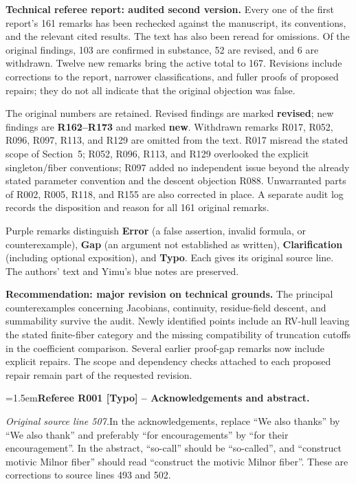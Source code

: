 \documentclass[12pt]{amsart}
\newcommand{\RefereeRemark}[4]{%
  \par\medskip\begingroup\normalfont\small\color{RefereePurple}%
  \emergencystretch=1.5em\noindent\textbf{Referee R#1 [#2] -- #3.}\par\nobreak\noindent #4\par
  \endgroup\medskip
}
\theoremstyle{plain}
\theoremstyle{definition}
\theoremstyle{remark}
\numberwithin{equation}{section}
\theoremstyle{plain}
\newcommand{\0}{\emptyset}
\begin{document}
{\normalfont\small\color{RefereePurple}
\noindent\textbf{Technical referee report: audited second version.}
Every one of the first report's 161 remarks has been rechecked against the manuscript, its conventions, and the relevant cited results. The text has also been reread for omissions. Of the original findings, 103 are confirmed in substance, 52 are revised, and 6 are withdrawn. Twelve new remarks bring the active total to 167. Revisions include corrections to the report, narrower classifications, and fuller proofs of proposed repairs; they do not all indicate that the original objection was false.
\par\smallskip
The original numbers are retained. Revised findings are marked \textbf{revised}; new findings are \textbf{R162--R173} and marked \textbf{new}. Withdrawn remarks R017, R052, R096, R097, R113, and R129 are omitted from the text. R017 misread the stated scope of Section~5; R052, R096, R113, and R129 overlooked the explicit singleton/fiber conventions; R097 added no independent issue beyond the already stated parameter convention and the descent objection R088. Unwarranted parts of R002, R005, R118, and R155 are also corrected in place. A separate audit log records the disposition and reason for all 161 original remarks.
\par\smallskip
Purple remarks distinguish \textbf{Error} (a false assertion, invalid formula, or counterexample), \textbf{Gap} (an argument not established as written), \textbf{Clarification} (including optional exposition), and \textbf{Typo}. Each gives its original source line. The authors' text and Yimu's blue notes are preserved.
\par\smallskip
\noindent\textbf{Recommendation: major revision on technical grounds.}
The principal counterexamples concerning Jacobians, continuity, residue-field descent, and summability survive the audit. Newly identified points include an RV-hull leaving the stated finite-fiber category and the missing compatibility of truncation cutoffs in the coefficient comparison. Several earlier proof-gap remarks now include explicit repairs. The scope and dependency checks attached to each proposed repair remain part of the requested revision.
\par}

\RefereeRemark{001}{Typo}{Acknowledgements and abstract}{%
\textit{Original source line 507.}\quad In the acknowledgements, replace ``We also thanks'' by ``We also thank'' and preferably ``for encouragements'' by ``for their encouragement''. In the abstract, ``so-call'' should be ``so-called'', and ``construct motivic Milnor fiber'' should read ``construct the motivic Milnor fiber''. These are corrections to source lines 493 and 502.
}
\end{document}
